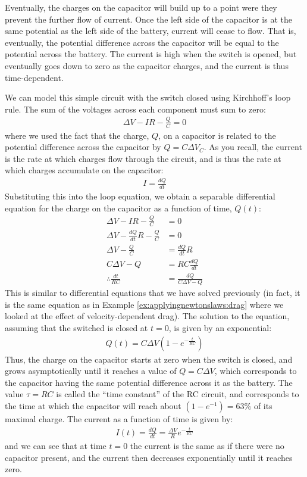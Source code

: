 Eventually, the charges on the capacitor will build up to a point were they prevent the further flow of current. Once the left side of the capacitor is at the same potential as the left side of the battery, current will cease to flow. That is, eventually, the potential difference across the capacitor will be equal to the potential across the battery. The current is high when the switch is opened, but eventually goes down to zero as the capacitor charges, and the current is thus time-dependent. 

We can model this simple circuit with the switch closed using Kirchhoff's loop rule. The sum of the voltages across each component must sum to zero:
\begin{align*}
\Delta V - IR - \frac{Q}{C} = 0
\end{align*}
where we used the fact that the charge, $Q$, on a capacitor is related to the potential difference across the capacitor by $Q=C\Delta V_C$. As you recall, the current is the rate at which charges flow through the circuit, and is thus the rate at which charges accumulate on the capacitor:
\begin{align*}
I=\frac{dQ}{dt}
\end{align*}
Substituting this into the loop equation, we obtain a separable differential equation for the charge on the capacitor as a function of time, $Q(t)$:
\begin{align*}
\Delta V - IR - \frac{Q}{C} &= 0\\
\Delta V - \frac{dQ}{dt}R - \frac{Q}{C} &= 0\\
\Delta V - \frac{Q}{C} &= \frac{dQ}{dt}R\\
C\Delta V - Q &= RC\frac{dQ}{dt}\\
\therefore \frac{dt}{RC}&=\frac{dQ}{C\Delta V - Q }
\end{align*}
This is similar to differential equations that we have solved previously (in fact, it is the same equation as in Example \ref{ex:applyingnewtonslaws:drag} where we looked at the effect of velocity-dependent drag). The solution to the equation, assuming that the switched is closed at $t=0$, is given by an exponential:
\begin{align*}
Q(t) = C\Delta V\left( 1 - e^{-\frac{t}{RC}} \right)
\end{align*}
Thus, the charge on the capacitor starts at zero when the switch is closed, and grows asymptotically until it reaches a value of $Q=C\Delta V$, which corresponds to the capacitor having the same potential difference across it as the battery. The value $\tau=RC$ is called the ``time constant'' of the RC circuit, and corresponds to the time at which the capacitor will reach about $(1-e^{-1})=63\%$ of its maximal charge. The current as a function of time is given by:
\begin{align*}
I(t)=\frac{dQ}{dt}=\frac{\Delta V}{R}e^{-\frac{t}{RC}}
\end{align*}
and we can see that at time $t=0$ the current is the same as if there were no capacitor present, and the current then decreases exponentially until it reaches zero.

